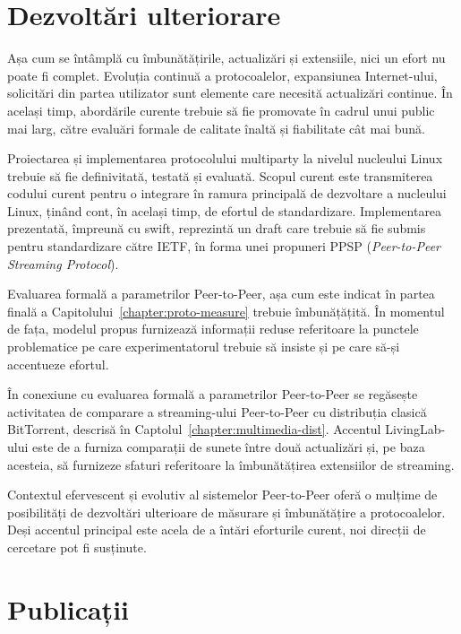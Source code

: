 \section{Dezvoltări ulteriorare}
\label{sec:conclusion:future}

Așa cum se întâmplă cu îmbunătățirile, actualizări și extensiile, nici un
efort nu poate fi complet. Evoluția continuă a protocoalelor, expansiunea
Internet-ului, solicitări din partea utilizator sunt elemente care necesită
actualizări continue. În același timp, abordările curente trebuie să fie
promovate în cadrul unui public mai larg, către evaluări formale de calitate
înaltă și fiabilitate cât mai bună.

Proiectarea și implementarea protocolului multiparty la nivelul nucleului
Linux trebuie să fie definivitată, testată și evaluată. Scopul curent este
transmiterea codului curent pentru o integrare în ramura principală de
dezvoltare a nucleului Linux, ținând cont, în același timp, de efortul de
standardizare. Implementarea prezentată, împreună cu swift, reprezintă un
draft care trebuie să fie submis pentru standardizare către IETF, în forma
unei propuneri PPSP (\textit{Peer-to-Peer Streaming Protocol}).

Evaluarea formală a parametrilor Peer-to-Peer, așa cum este indicat în partea
finală a Capitolului~\ref{chapter:proto-measure} trebuie îmbunățățită. În
momentul de fața, modelul propus furnizează informații reduse referitoare la
punctele problematice pe care experimentatorul trebuie să insiste și pe care
să-și accentueze efortul.

În conexiune cu evaluarea formală a parametrilor Peer-to-Peer se regăsește
activitatea de comparare a streaming-ului Peer-to-Peer cu distribuția clasică
BitTorrent, descrisă în Captolul~\ref{chapter:multimedia-dist}. Accentul
LivingLab-ului este de a furniza comparații de sunete între două actualizări
și, pe baza acesteia, să furnizeze sfaturi referitoare la îmbunătățirea
extensiilor de streaming.

Contextul efervescent și evolutiv al sistemelor Peer-to-Peer oferă o mulțime
de posibilități de dezvoltări ulterioare de măsurare și îmbunătățire a
protocoalelor. Deși accentul principal este acela de a întări eforturile
curent, noi direcții de cercetare pot fi susținute.

\section{Publicații}
\label{sec:conclusion:publications}

